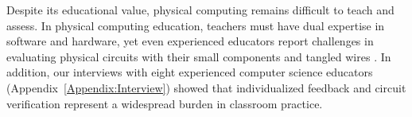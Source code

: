 \documentclass{article} %
\begin{document}

Despite its educational value, physical computing remains difficult to teach and assess.
In physical computing education, teachers must have dual expertise in software and hardware, yet even experienced educators report challenges in evaluating physical circuits with their small components and tangled wires \citep{hyeon2016study,theodoropoulos2018computing}.
In addition, our interviews with eight experienced computer science educators (Appendix~\ref{Appendix:Interview}) showed that individualized feedback and circuit verification represent a widespread burden in classroom practice.
\end{document}
